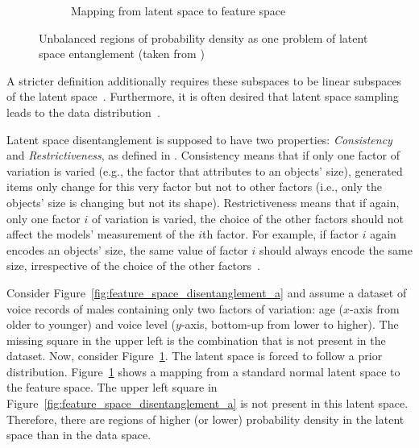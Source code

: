 \begin{figure}
\begin{subfigure}{.3\textwidth}
        \caption{Mapping from latent space to feature space}
        \label{fig:feature_space_disentanglement_b}
    \end{subfigure}
    \caption[Latent Space Entanglement]{Unbalanced regions of probability density as one problem of latent space entanglement (taken from \citet{karras2019style})}
    \label{fig:feature_space_disentanglement}
\end{figure}
A stricter definition additionally requires these subspaces to be linear subspaces of the latent space~\citep{higgins2018towards}.
Furthermore, it is often desired that latent space sampling leads to the data distribution~\citep{karras2019style}.

Latent space disentanglement is supposed to have two properties: \textit{Consistency} and \textit{Restrictiveness}, as defined in \citet{Shu2020Weakly}.
Consistency means that if only one factor of variation is varied (e.g., the factor that attributes to an objects' size), generated items only change for this very factor but not to other factors (i.e., only the objects' size is changing but not its shape).
Restrictiveness means that if again, only one factor $i$ of variation is varied, the choice of the other factors should not affect the models' measurement of the $i$th factor.
For example, if factor $i$ again encodes an objects' size, the same value of factor $i$ should always encode the same size, irrespective of the choice of the other factors~\citep{Shu2020Weakly}.

Consider Figure~\ref{fig:feature_space_disentanglement_a} and assume a dataset of voice records of males containing only two factors of variation: age ($x$-axis from older to younger) and voice level ($y$-axis, bottom-up from lower to higher).
The missing square in the upper left is the combination  that is not present in the dataset.
Now, consider Figure~\ref{fig:feature_space_disentanglement_b}.
The latent space is forced to follow a prior distribution.
Figure~\ref{fig:feature_space_disentanglement_b} shows a mapping from a standard normal latent space to the feature space.
The upper left square in Figure~\ref{fig:feature_space_disentanglement_a} is not present in this latent space.
Therefore, there are regions of higher (or lower) probability density in the latent space than in the data space.

